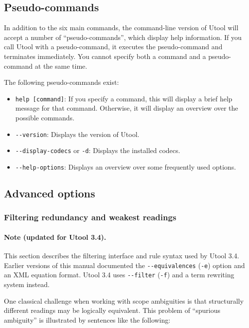 \subsection{Pseudo-commands}

In addition to the six main commands, the command-line version of
Utool will accept a number of ``pseudo-commands'', which display help
information. If you call Utool with a pseudo-command, it executes the
pseudo-command and terminates immediately. You cannot specify both a
command and a pseudo-command at the same time.

The following pseudo-commands exist:

\begin{itemize}
\item \verb?help [command]?: If you specify a command, this will
display a brief help message for that command. Otherwise, it will
display an overview over the possible commands.
\item \verb?--version?: Displays the version of Utool.
\item \verb?--display-codecs? or \verb?-d?: Displays the installed
codecs.
\item \verb?--help-options?: Displays an overview over some frequently
used options.
\end{itemize}




\subsection{Advanced options}

\subsubsection{Filtering redundancy and weakest readings} \label{sec:redund-elim}

\paragraph{Note (updated for Utool 3.4).}
This section describes the filtering interface and rule syntax used by
Utool 3.4. Earlier versions of this manual documented the
\verb?--equivalences? (\verb?-e?) option and an XML equation format.
Utool 3.4 uses \verb?--filter? (\verb?-f?) and a term rewriting system
instead.

One classical challenge when working with scope ambiguities is that
structurally different readings may be logically equivalent. This
problem of ``spurious ambiguity'' is illustrated by sentences like the
following:

